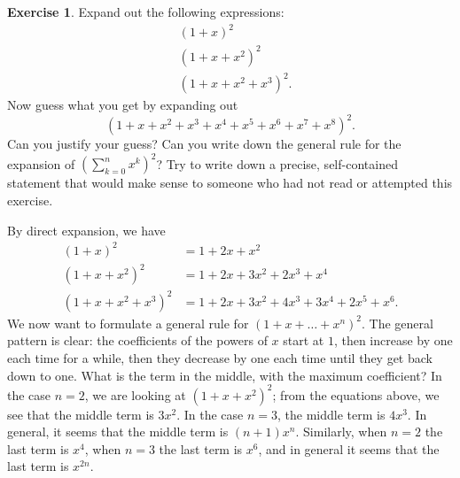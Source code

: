 \documentclass[a4paper]{book}
\renewcommand{\:}{\colon}
\theoremstyle{definition}
\newtheorem{exercise}[theorem]{Exercise}
\renewenvironment{solution}{\SolutionInline}{\endSolutionInline}
\begin{document}
\begin{exercise}
 Expand out the following expressions:
 \begin{align*}
  & (1 + x)^2 \\
  & (1 + x + x^2)^2 \\
  & (1 + x + x^2 + x^3)^2.
 \end{align*}
 Now guess what you get by expanding out
 \[ (1 + x + x^2 + x^3 + x^4 + x^5 + x^6 + x^7 + x^8)^2. \]
 Can you justify your guess?  Can you write down the general rule for
 the expansion of $(\sum_{k=0}^n x^k)^2$?  Try to write down a
 precise, self-contained statement that would make sense to someone
 who had not read or attempted this exercise.
\end{exercise}
\begin{solution}
 By direct expansion, we have
 \begin{align*}
  (1 + x)^2 &= 1 + 2x + x^2 \\
  (1 + x + x^2)^2 &= 1 + 2x + 3x^2 + 2x^3 + x^4 \\
  (1 + x + x^2 + x^3)^2 &= 1 + 2x + 3x^2 + 4x^3 + 3x^4 + 2x^5 + x^6.
 \end{align*}
 We now want to formulate a general rule for $(1+x+\ldots+x^n)^2$.  The general
 pattern is clear: the coefficients of the powers of $x$ start at $1$, then
 increase by one each time for a while, then they decrease by one each time
 until they get back down to one.  What is the term in the middle, with the
 maximum coefficient?  In the case $n=2$, we are looking at $(1+x+x^2)^2$; from
 the equations above, we see that the middle term is $3x^2$.  In the case $n=3$,
 the middle term is $4x^3$.  In general, it seems that the middle term is
 $(n+1)x^n$.  Similarly, when $n=2$ the last term is $x^4$, when $n=3$ the last
 term is $x^6$, and in general it seems that the last term is $x^{2n}$.


\end{solution}
\end{document}
